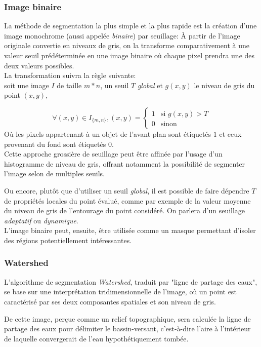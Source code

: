 \documentclass[a4paper,12pt]{report}
\begin{document}
\subsubsection{Image binaire}
La méthode de segmentation la plus simple et la plus rapide est la création d'une image monochrome (aussi appelée \textit{binaire}) par seuillage: \`A partir de l'image originale convertie en niveaux de gris, on la transforme comparativement à une valeur seuil prédéterminée en une image binaire où chaque pixel prendra une des deux valeurs possibles.\\

La transformation suivra la règle suivante:\\
soit une image $I$ de taille $m*n$, un seuil $T$ \textit{global} et $g(x,y)$ le niveau de gris du point $(x,y)$,

$$ \forall (x,y) \in I_{\{m,n\}}, (x,y) = \left\{ 
\begin{array}{rl}
1 &\mbox{si } g(x,y)>T\\
0 &\mbox{sinon}
\end{array} \right.
$$ 
Où les pixels appartenant à un objet de l'avant-plan sont étiquetés $1$ et ceux provenant du fond sont étiquetés $0$.\\ 

Cette approche grossière de seuillage peut être affinée par l'usage d'un histogramme de niveau de gris, offrant notamment la possibilité de segmenter l'image selon de multiples seuils.

Ou encore, plutôt que d'utiliser un seuil \textit{global}, il est possible de faire dépendre $T$ de propriétés locales du point évalué, comme par exemple de la valeur moyenne du niveau de gris de l'entourage du point considéré. On parlera d'un seuillage \textit{adaptatif} ou \textit{dynamique}.\\

L'image binaire peut, ensuite, être utilisée comme un masque permettant d'isoler des régions potentiellement intéressantes.

\subsubsection{Watershed}
L'algorithme de segmentation \textit{Watershed}, traduit par "ligne de partage des eaux", se base sur une interprétation tridimensionnelle de l'image, où un point est caractérisé par ses deux composantes spatiales et son niveau de gris.

De cette image, perçue comme un relief topographique, sera calculée la ligne de partage des eaux pour délimiter le bassin-versant, c'est-à-dire l'aire à l'intérieur de laquelle convergerait de l'eau hypothétiquement tombée. 
\end{document}
